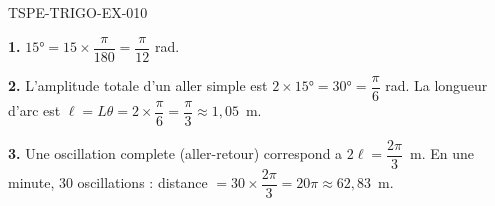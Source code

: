 \begin{corrige}{TSPE-TRIGO-EX-010}

\textbf{1.} $15° = 15 \times \dfrac{\pi}{180} = \dfrac{\pi}{12}$ rad.

\textbf{2.} L'amplitude totale d'un aller simple est $2 \times 15° = 30° = \dfrac{\pi}{6}$ rad. La longueur d'arc est $\ell = L\theta = 2 \times \dfrac{\pi}{6} = \dfrac{\pi}{3} \approx 1{,}05$~m.

\textbf{3.} Une oscillation complete (aller-retour) correspond a $2\ell = \dfrac{2\pi}{3}$~m. En une minute, $30$ oscillations : distance $= 30 \times \dfrac{2\pi}{3} = 20\pi \approx 62{,}83$~m.

\end{corrige}
